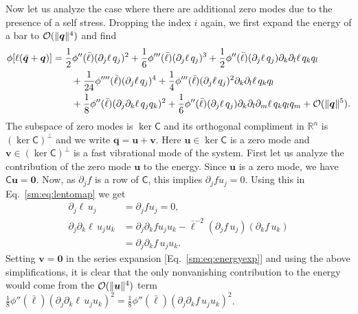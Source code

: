 Now let us analyze the case where there are additional zero modes due to the presence of a self stress.
Dropping the index $i$ again, we first expand the energy of a bar to $\mathcal{O}(\lVert\bm{q}\rVert^4)$ and find
%
\begin{equation}
  \begin{aligned}
    \phi[\ell(\bar{\bm{q}} + \bm{q})] &=
    \frac{1}{2}\phi''(\bar{\ell})(\partial_j \ell\,q_j)^2 +
    \frac{1}{6}\phi'''(\bar{\ell})(\partial_j \ell\,q_j)^3 +
    \frac{1}{2}\phi''(\bar{\ell})(\partial_j \ell\,q_j)\partial_k\partial_l \ell\, q_k q_l\\ &\qquad+
    \frac{1}{24}\phi''''(\bar{\ell})(\partial_j \ell\,q_j)^4 +
    \frac{1}{4}\phi'''(\bar{\ell})(\partial_j \ell\,q_j)^2 \partial_k \partial_l \ell\, q_k q_l\\ &\qquad+
    \frac{1}{8}\phi''(\bar{\ell})(\partial_j\partial_k \ell\, q_j q_k)^2 +
    \frac{1}{6}\phi''(\bar{\ell})(\partial_j \ell\, q_j)\partial_k\partial_l\partial_m \ell\, q_k q_l q_m + \mathcal{O}(\lVert\bm{q}\rVert^5).
  \end{aligned}
  \label{sm:eq:energyexp}
\end{equation}
%
The subspace of zero modes is $\ker\mathsf{C}$ and its orthogonal compliment in $\mathbb{R}^n$ is $(\ker\mathsf{C})^\perp$ and we write $\bm{q} = \bm{u} + \bm{v}$.
Here $\bm{u} \in \ker\mathsf{C}$ is a zero mode and $\bm{v} \in (\ker\mathsf{C})^{\perp}$ is a fast vibrational mode of the system.
First let us analyze the contribution of the zero mode $\bm{u}$ to the energy.
Since $\bm{u}$ is a zero mode, we have $\mathsf{C}\bm{u} = \bm{0}$.
Now, as $\partial_j f$ is a row of $\mathsf{C}$, this implies $\partial_j f u_j = 0$.
Using this in Eq.~\eqref{sm:eq:lentomap} we get
%
\begin{equation}
  \begin{aligned}
    \partial_j \ell\,u_j &= \partial_j f u_j=0,\\
    \partial_j \partial_k \ell\, u_j u_k
                        &= \partial_j\partial_k f u_j u_k - \bar{\ell}^{-2}(\partial_j f\, u_j) (\partial_k f\, u_k)\\
                        &= \partial_j\partial_k f\, u_j u_k.
  \end{aligned}
\end{equation}
%
Setting $\bm{v} = \bm{0}$ in the series expansion [Eq.~\eqref{sm:eq:energyexp}] and using the above simplifications, it is clear that the only nonvanishing contribution to the energy would come from the $\mathcal{O}(\lVert\bm{u}\rVert^4)$ term $\frac{1}{8}{\phi''(\bar{\ell})}(\partial_j \partial_k \ell\, u_j u_k)^2 = \frac{1}{8}{\phi''(\bar{\ell})}(\partial_j \partial_k f\, u_j u_k)^2$.

